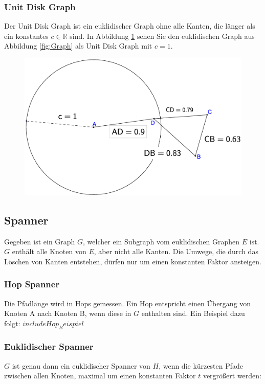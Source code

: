 \documentclass[a4paper,twoside]{IEEEtran}
\begin{document}
\subsubsection{Unit Disk Graph}
Der Unit Disk Graph ist ein euklidischer Graph ohne alle Kanten, die länger als ein konstantes $c \in \mathds{R} $ sind. In Abbildung \ref{fig:UnitGraph} sehen Sie den euklidischen Graph aus Abbildung \ref{fig:Graph} als Unit Disk Graph mit $c = 1 $.
\begin{figure}[h!]
\centering
\includegraphics[width=0.99\linewidth]{UnitGraph.eps}
\caption{}
\label{fig:UnitGraph}
\end{figure}



\subsection{Spanner}
Gegeben ist ein Graph $G $, welcher ein Subgraph vom euklidischen Graphen $E $ ist. $G $ enthält alle Knoten von $E $, aber nicht alle Kanten. Die Umwege, die durch das Löschen von Kanten entstehen, dürfen nur um einen konstanten Faktor ansteigen. 

\subsubsection{Hop Spanner}
Die Pfadlänge wird in Hops gemessen. Ein Hop entspricht einen Übergang von Knoten A nach Knoten B, wenn diese in $G $ enthalten sind. Ein Beispiel dazu folgt:
$include Hop_Beispiel $
\subsubsection{Euklidischer Spanner}
$G $ ist genau dann ein euklidischer Spanner von $H $, wenn die kürzesten Pfade zwischen allen Knoten, maximal um einen konstanten Faktor $t $ vergrößert werden:
\end{document}
